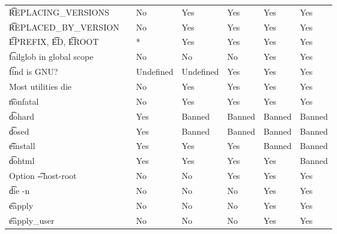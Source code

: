 \begin{landscape}
\begin{longtable}{llP{7.5em}P{7.5em}P{7.5em}P{7.5em}P{7.5em}}
\t{REPLACING_VERSIONS} &  &
    No & Yes & Yes & Yes & Yes \\

\t{REPLACED_BY_VERSION} &  &
    No & Yes & Yes & Yes & Yes \\

\t{EPREFIX}, \t{ED}, \t{EROOT} &  &
    * & Yes & Yes & Yes & Yes \\

\t{failglob} in global scope &  &
    No & No & No & Yes & Yes \\

\t{find} is GNU? &  &
    Undefined & Undefined & Yes & Yes & Yes \\

Most utilities die &  &
    No & Yes & Yes & Yes & Yes \\

\t{nonfatal} &  &
    No & Yes & Yes & Yes & Yes \\

\t{dohard} &  &
    Yes & Banned & Banned & Banned & Banned \\

\t{dosed} &  &
    Yes & Banned & Banned & Banned & Banned \\

\t{einstall} &  &
    Yes & Yes & Yes & Banned & Banned \\

\t{dohtml} &  &
    Yes & Yes & Yes & Yes & Banned \\

Option \t{-{}-host-root} &  &
    No & No & Yes & Yes & Yes \\

\t{die -n} &  &
    No & No & No & Yes & Yes \\

\t{eapply} &  &
    No & No & No & Yes & Yes \\

\t{eapply_user} &  &
    No & No & No & Yes & Yes \\


\end{longtable}
\end{landscape}
